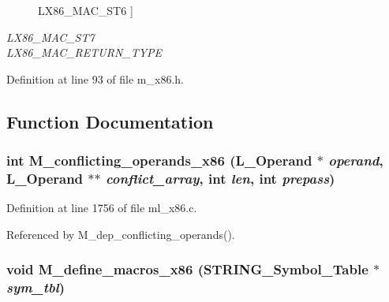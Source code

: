 \begin{Desc}
\begin{description}
{LX86\_\-MAC\_\-ST6\label{m__x86_8h_af8fd5f0e57d456151c951e0f3715fc48d45ae21f4b3b9621a99531222f7f180}
}]\item[{\em 
LX86\_\-MAC\_\-ST7\label{m__x86_8h_af8fd5f0e57d456151c951e0f3715fc4e91e632479328076a65e9a01e3659f47}
}]\item[{\em 
LX86\_\-MAC\_\-RETURN\_\-TYPE\label{m__x86_8h_af8fd5f0e57d456151c951e0f3715fc453b93aa41a0ca400daed8b6e9a29357e}
}]\end{description}
\end{Desc}



Definition at line 93 of file m\_\-x86.h.

\subsection{Function Documentation}
\subsubsection{\setlength{\rightskip}{0pt plus 5cm}int M\_\-conflicting\_\-operands\_\-x86 (L\_\-Operand $\ast$ {\em operand}, L\_\-Operand $\ast$$\ast$ {\em conflict\_\-array}, int {\em len}, int {\em prepass})}\label{m__x86_8h_0c7d08aa0ec4542131f0971a87ba2876}




Definition at line 1756 of file ml\_\-x86.c.

Referenced by M\_\-dep\_\-conflicting\_\-operands().
\subsubsection{\setlength{\rightskip}{0pt plus 5cm}void M\_\-define\_\-macros\_\-x86 (\bf{STRING\_\-Symbol\_\-Table} $\ast$ {\em sym\_\-tbl})}\label{m__x86_8h_1f354096fc2141fa3c80525dffdf5ca5}




